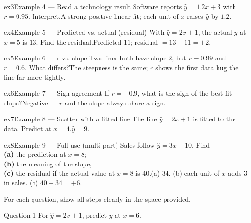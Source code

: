 \documentclass[11pt]{article}
\begin{document}
\begin{example}{ex3}{Example 4 --- Read a technology result}
Software reports $\hat y=1.2x+3$ with $r=0.95$. Interpret.\soln A strong positive linear fit; each unit of $x$ raises $\hat y$ by $1.2$.
\end{example}

\begin{example}{ex4}{Example 5 --- Predicted vs. actual (residual)}
With $\hat y=2x+1$, the actual $y$ at $x=5$ is $13$. Find the residual.\soln Predicted $11$; residual $=13-11=+2$.
\end{example}

\begin{example}{ex5}{Example 6 --- r vs. slope}
Two lines both have slope $2$, but $r=0.99$ and $r=0.6$. What differs?\soln The steepness is the same; $r$ shows the first data hug the line far more tightly.
\end{example}

\begin{example}{ex6}{Example 7 --- Sign agreement}
If $r=-0.9$, what is the sign of the best-fit slope?\soln Negative --- $r$ and the slope always share a sign.
\end{example}

\begin{example}{ex7}{Example 8 --- Scatter with a fitted line}
The line $\hat y=2x+1$ is fitted to the data. Predict at $x=4$.\soln $\hat y=9$.
\end{example}

\begin{example}{ex8}{Example 9 --- Full use (multi-part)}
Sales follow $\hat y=3x+10$. Find \\ \textbf{(a)} the prediction at $x=8$; \\ \textbf{(b)} the meaning of the slope; \\ \textbf{(c)} the residual if the actual value at $x=8$ is $40$.\soln (a) $34$. (b) each unit of $x$ adds $3$ in sales. (c) $40-34=+6$.
\end{example}

\clearpage
{}
For each question, show all steps clearly in the space provided.

\begin{qbox}{Question 1}
For $\hat y=2x+1$, predict $y$ at $x=6$.\workspace{2.4cm}
\end{qbox}
\end{document}
